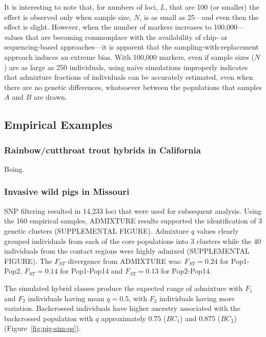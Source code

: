 {\begin{figure}
\caption[\biassimscap]{\biassimscap}
\label{fig:bias-sims}
\end{figure}
It is interesting to note
that, for numbers of loci,  $L$, that are 100 (or smaller) the effect is observed only when
sample size, $N$, is as small as 25---and even then the effect is slight.  However, when the
number of markers increases to 100,000---values that are becoming commonplace with the availability of chip-
or sequencing-based approaches---it is apparent that the sampling-with-replacement approach
induces an extreme bias.  With 100,000 markers, even if sample sizes ($N$) are as large as 250 individuals,
using na\"{i}ve simulations improperly indicates that admixture fractions of individuals can be
accurately estimated, even when there are no genetic differences, whatsoever between the populations that
samples $A$ and $B$ are drawn.

\subsection*{Empirical Examples}

\subsubsection*{Rainbow/cutthroat trout hybrids in California}

Boing.

\subsubsection*{Invasive wild pigs in Missouri}

SNP filtering resulted in 14,233 loci that were used for subsequent analysis. 
Using the 160 empirical samples, ADMIXTURE results supported the identification of 
3 genetic clusters (SUPPLEMENTAL FIGURE). Admixture $q$ values clearly grouped individuals 
from each of the core populations into 3 clusters while the 40 individuals from the contact regions were 
highly admixed (SUPPLEMENTAL FIGURE). The
$F_{ST}$ divergence from ADMIXTURE was: 
$F_{ST} = 0.24$ for Pop1-Pop2, 
$F_{ST} = 0.14$ for Pop1-Pop14 and 
$F_{ST} = 0.13$ for Pop2-Pop14.

The simulated hybrid classes produce 
the expected range of admixture with $F_1$ and $F_2$ individuals having mean $q=0.5$, with $F_2$ individuals having 
more variation. Backcrossed individuals have higher ancestry associated with the backcrossed population with $q$ 
approximately $0.75$ ($BC_1$) and $0.875$ ($BC_2$) (Figure~\ref{fig:pig-sim-qs}).

}
